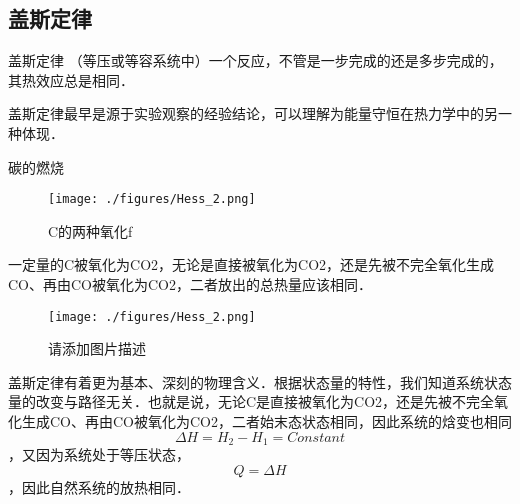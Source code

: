 
\subsection{盖斯定律}
\begin{theorem}{盖斯定律}
（等压或等容系统中）一个反应，不管是一步完成的还是多步完成的，其热效应总是相同．
\end{theorem}
盖斯定律最早是源于实验观察的经验结论，可以理解为能量守恒在热力学中的另一种体现．

\begin{example}{碳的燃烧}
\begin{figure}[ht]
\centering
\texttt{[image: ./figures/Hess\_2.png]}
\caption{C的两种氧化f} \label{Hess_fig2}
\end{figure}
一定量的C被氧化为CO2，无论是直接被氧化为CO2，还是先被不完全氧化生成CO、再由CO被氧化为CO2，二者放出的总热量应该相同．
\end{example}

\begin{figure}[ht]
\centering
\texttt{[image: ./figures/Hess\_2.png]}
\caption{请添加图片描述} \label{Hess_fig2}
\end{figure}
盖斯定律有着更为基本、深刻的物理含义．根据状态量的特性，我们知道系统状态量的改变与路径无关．也就是说，无论C是直接被氧化为CO2，还是先被不完全氧化生成CO、再由CO被氧化为CO2，二者始末态状态相同，因此系统的焓变也相同$$\Delta H=H_2-H_1=Constant$$，又因为系统处于等压状态，$$Q=\Delta H$$，因此自然系统的放热相同．

